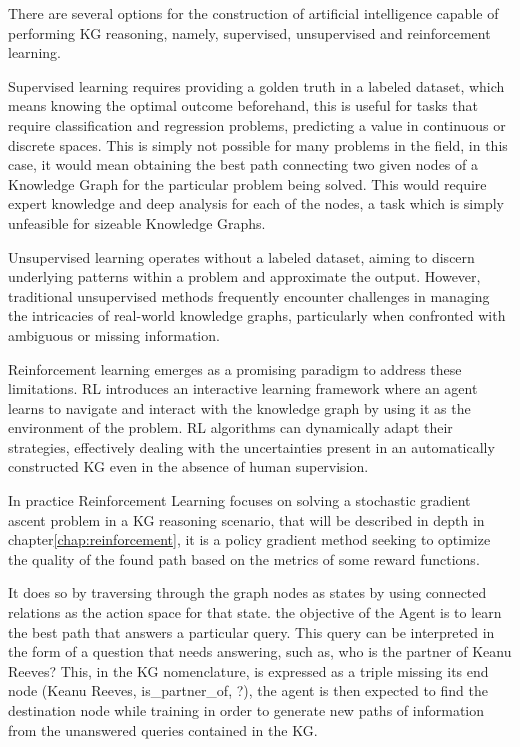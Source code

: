 There are several options for the construction of artificial intelligence capable of performing KG reasoning, namely, supervised, unsupervised and reinforcement learning.

Supervised learning requires providing a golden truth in a labeled dataset, which means knowing the optimal outcome beforehand, this is useful for tasks that require classification and regression problems, predicting a value in continuous or discrete spaces. This is simply not possible for many problems in the field, in this case, it would mean obtaining the best path connecting two given nodes of a Knowledge Graph for the particular problem being solved. This would require expert knowledge and deep analysis for each of the nodes, a task which is simply unfeasible for sizeable Knowledge Graphs.


Unsupervised learning operates without a labeled dataset, aiming to discern underlying patterns within a problem and approximate the output. However, traditional unsupervised methods frequently encounter challenges in managing the intricacies of real-world knowledge graphs, particularly when confronted with ambiguous or missing information.

Reinforcement learning emerges as a promising paradigm to address these limitations. RL introduces an interactive learning framework where an agent learns to navigate and interact with the knowledge graph by using it as the environment of the problem. RL algorithms can dynamically adapt their strategies, effectively dealing with the uncertainties present in an automatically constructed KG even in the absence of human supervision.

In practice Reinforcement Learning focuses on solving a stochastic gradient ascent problem in a KG reasoning scenario, that will be described in depth in chapter\ref{chap:reinforcement}, it is a policy gradient method seeking to optimize the quality of the found path based on the metrics of some reward functions. 

It does so by traversing through the graph nodes as states by using connected relations as the action space for that state. the objective of the Agent is to learn the best path that answers a particular query. This query can be interpreted in the form of a question that needs answering, such as, who is the partner of Keanu Reeves? This, in the KG nomenclature, is expressed as a triple missing its end node (Keanu Reeves, is\_partner\_of, ?), the agent is then expected to find the destination node while training in order to generate new paths of information from the unanswered queries contained in the KG.

